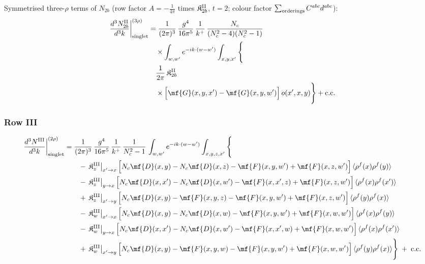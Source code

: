 { Symmetrised three-$\rho$ terms of $N_{2b}$ (row factor $A=-\frac{1}{4\pi}$ times $\mathfrak{K}^{\rm II}_{2b}$, $t=2$; colour factor $\sum_{\rm orderings}C^{abc}d^{abc}$):
\begin{align}
\frac{d^{3}N_{2b}^{\rm II}}{d^{3}k}\bigg|^{(3\rho)}_{\rm singlet}&=\frac{1}{(2\pi)^{3}}\,\frac{g^{4}}{16\pi^{5}}\,\frac{1}{k^{+}}\,\frac{N_{c}}{(N_{c}^{2}-4)(N_{c}^{2}-1)}\notag\\
&\quad\times\int_{w,w'}e^{-ik\cdot(w-w')}\int_{x,y,x'}\Bigg\{\notag\\
&\quad\frac{1}{2\pi}\,\mathfrak{K}^{\rm II}_{2b}\notag\\
&\quad\times\Big[\mf{G}(x,y,x')-\mf{G}(x,y,w')\Big]\,o(x',x,y)\Bigg\}+{\rm c.c.}\label{eq:s-o-I-II-2b}
\end{align}

\subsubsection*{Row III}

\begin{align}
\frac{d^{3}N^{\rm III}}{d^{3}k}\bigg|^{(2\rho)}_{\rm singlet}&=\frac{1}{(2\pi)^{3}}\,\frac{g^{4}}{16\pi^{5}}\,\frac{1}{k^{+}}\,\frac{1}{N_{c}^{2}-1}\,\int_{w,w'}e^{-ik\cdot(w-w')}\int_{x,y,z,x'}\Bigg\{\notag\\
&\qquad -\,\mathfrak{K}^{\rm III}_{z}\big|_{x'\to x}\,\Big[N_{c}\mf{D}(x,y)-N_{c}\mf{D}(x,z)-\mf{F}(x,y,w')+\mf{F}(x,z,w')\Big]\,\langle\rho^{f}(x)\rho^{f}(y)\rangle\notag\\
&\qquad -\,\mathfrak{K}^{\rm III}_{z}\big|_{y\to x}\,\Big[N_{c}\mf{D}(x,x')-N_{c}\mf{D}(x,w')-\mf{F}(x,x',z)+\mf{F}(x,z,w')\Big]\,\langle\rho^{f}(x)\rho^{f}(x')\rangle\notag\\
&\qquad +\,\mathfrak{K}^{\rm III}_{z}\big|_{x'\to y}\,\Big[N_{c}\mf{D}(x,y)-\mf{F}(x,y,z)-\mf{F}(x,y,w')+\mf{F}(x,z,w')\Big]\,\langle\rho^{f}(y)\rho^{f}(x)\rangle\notag\\
&\qquad -\,\mathfrak{K}^{\rm III}_{w}\big|_{x'\to x}\,\Big[N_{c}\mf{D}(x,y)-N_{c}\mf{D}(x,w)-\mf{F}(x,y,w')+\mf{F}(x,w,w')\Big]\,\langle\rho^{f}(x)\rho^{f}(y)\rangle\notag\\
&\qquad -\,\mathfrak{K}^{\rm III}_{w}\big|_{y\to x}\,\Big[N_{c}\mf{D}(x,x')-N_{c}\mf{D}(x,w')-\mf{F}(x,x',w)+\mf{F}(x,w,w')\Big]\,\langle\rho^{f}(x)\rho^{f}(x')\rangle\notag\\
&\qquad +\,\mathfrak{K}^{\rm III}_{w}\big|_{x'\to y}\,\Big[N_{c}\mf{D}(x,y)-\mf{F}(x,y,w)-\mf{F}(x,y,w')+\mf{F}(x,w,w')\Big]\,\langle\rho^{f}(y)\rho^{f}(x)\rangle\Bigg\}\;+\;{\rm c.c.}\label{eq:s-I-III}
\end{align}

}
